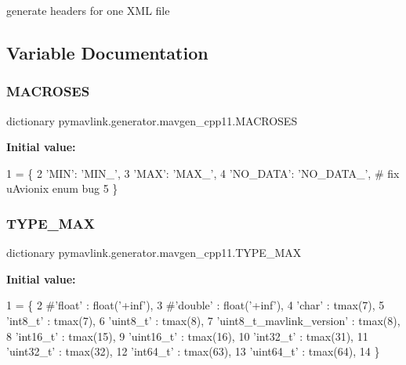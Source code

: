 \begin{DoxyVerb}generate headers for one XML file\end{DoxyVerb}
 

\subsection{Variable Documentation}
\mbox{\label{namespacepymavlink_1_1generator_1_1mavgen__cpp11_a2944e7367458534a87570bf2f12fed44}} 
\subsubsection{\texorpdfstring{M\+A\+C\+R\+O\+S\+ES}{MACROSES}}
{\footnotesize\ttfamily dictionary pymavlink.\+generator.\+mavgen\+\_\+cpp11.\+M\+A\+C\+R\+O\+S\+ES}

{\bfseries Initial value\+:}
\begin{DoxyCode}
1 =  \{
2     \textcolor{stringliteral}{'MIN'}: \textcolor{stringliteral}{'MIN\_'},
3     \textcolor{stringliteral}{'MAX'}: \textcolor{stringliteral}{'MAX\_'},
4     \textcolor{stringliteral}{'NO\_DATA'}: \textcolor{stringliteral}{'NO\_DATA\_'},  \textcolor{comment}{# fix uAvionix enum bug}
5 \}
\end{DoxyCode}
\mbox{\label{namespacepymavlink_1_1generator_1_1mavgen__cpp11_a0bb0c7ed11b9127685311115712cb403}} 
\subsubsection{\texorpdfstring{T\+Y\+P\+E\+\_\+\+M\+AX}{TYPE\_MAX}}
{\footnotesize\ttfamily dictionary pymavlink.\+generator.\+mavgen\+\_\+cpp11.\+T\+Y\+P\+E\+\_\+\+M\+AX}

{\bfseries Initial value\+:}
\begin{DoxyCode}
1 =  \{
2     \textcolor{comment}{#'float'    : float('+inf'),}
3     \textcolor{comment}{#'double'   : float('+inf'),}
4     \textcolor{stringliteral}{'char'}     : tmax(7),
5     \textcolor{stringliteral}{'int8\_t'}   : tmax(7),
6     \textcolor{stringliteral}{'uint8\_t'}  : tmax(8),
7     \textcolor{stringliteral}{'uint8\_t\_mavlink\_version'}  : tmax(8),
8     \textcolor{stringliteral}{'int16\_t'}  : tmax(15),
9     \textcolor{stringliteral}{'uint16\_t'} : tmax(16),
10     \textcolor{stringliteral}{'int32\_t'}  : tmax(31),
11     \textcolor{stringliteral}{'uint32\_t'} : tmax(32),
12     \textcolor{stringliteral}{'int64\_t'}  : tmax(63),
13     \textcolor{stringliteral}{'uint64\_t'} : tmax(64),
14 \}
\end{DoxyCode}
